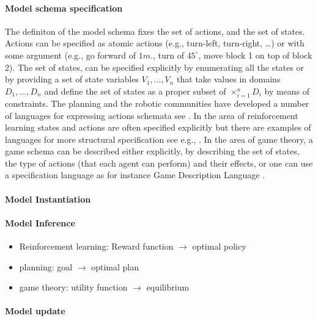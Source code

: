   \paragraph{Model schema specification}
  The definiton of the model schema fixes the set of actions, and the
  set of states. Actions can be specified as atomic actions (e.g.,
  turn-left, turn-right, \dots) or with some argument (e.g., go
  forward of $1m.$, turn of $45^\circ$, move block 1 on top of block
  2). The set of states, can be specified explicitly by enumerating
  all the states or by providing a set of state variables
  $V_1,\dots,V_n$ that take values in domains $D_1,\dots,D_n$ and
  define the set of states as a proper subset of $\times_{i=1}^nD_i$
  by means of constraints. The planning and the robotic communities
  have developed a number of languages for expressing actions schemata
  see \cite{nakawala2018approaches}.  In the area of reinforcement
  learning states and actions are often specified explicitly but there
  are examples of languages for more structural specification see
  e.g., \cite{jothimurugan2019composable,li2017reinforcement}.  In the
  area of game theory, a game schema can be described either
  explicitly, by describing the set of states, the type of actions
  (that each agent can perform) and their effects, or one can use a
  specification language as for instance Game Description Language
  \cite{thielscher2011general,jiang2016epistemic,kowalski2016towards}.

  \paragraph{Model Instantiation}
  
  \paragraph{Model Inference}

 \begin{itemize}
  \item Reinforcement learning:  Reward function $\rightarrow$ optimal policy

  \item planning: goal $\rightarrow$ optimal plan

  \item game theory: utility function $\rightarrow$ equilibrium 
  \end{itemize}
  \paragraph{Model update}


